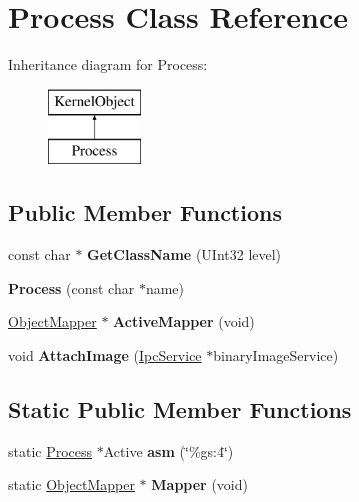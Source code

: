 \hypertarget{class_process}{}\section{Process Class Reference}
\label{class_process}
Inheritance diagram for Process\+:\begin{figure}[H]
\begin{center}
\leavevmode
\includegraphics[height=2.000000cm]{class_process}
\end{center}
\end{figure}
\subsection*{Public Member Functions}
\begin{DoxyCompactItemize}
\item 
\mbox{\label{class_process_af0b7ed12e6dffddad4efb76abc331ccb}} 
const char $\ast$ {\bfseries Get\+Class\+Name} (U\+Int32 level)
\item 
\mbox{\label{class_process_a361cd2b04f304cb3bd1e222c5b767cf3}} 
{\bfseries Process} (const char $\ast$name)
\item 
\mbox{\label{class_process_a2bb3f00dd929c5a5e8af39afffd9118b}} 
\hyperlink{class_object_mapper}{Object\+Mapper} $\ast$ {\bfseries Active\+Mapper} (void)
\item 
\mbox{\label{class_process_a6d286a25e03295edd34d926c335953f0}} 
void {\bfseries Attach\+Image} (\hyperlink{class_ipc_service}{Ipc\+Service} $\ast$binary\+Image\+Service)
\end{DoxyCompactItemize}
\subsection*{Static Public Member Functions}
\begin{DoxyCompactItemize}
\item 
\mbox{\label{class_process_a4cdbb0b1ac9fba40eba7e3931121fab1}} 
static \hyperlink{class_process}{Process} $\ast$Active {\bfseries asm} (\char`\"{}\%gs\+:4\char`\"{})
\item 
\mbox{\label{class_process_ac5522a53b0c690800afd06147c1cc8d3}} 
static \hyperlink{class_object_mapper}{Object\+Mapper} $\ast$ {\bfseries Mapper} (void)
\end{DoxyCompactItemize}
